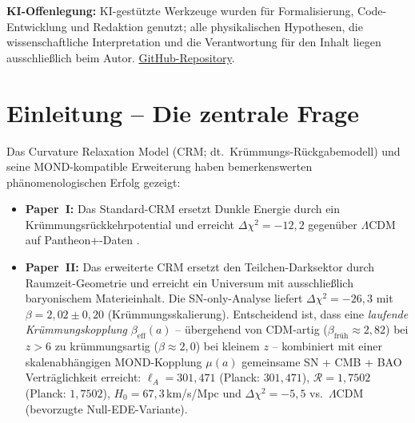 \documentclass[11pt,a4paper]{article}
\begin{document}
\clearpage
\begingroup
\footnotesize
{}
\setlength{\parskip}{0pt}
\tableofcontents

\vspace{0.35em}
{\scriptsize
\noindent\textbf{KI-Offenlegung:} KI-gest\"utzte Werkzeuge wurden f\"ur Formalisierung, Code-Entwicklung und Redaktion genutzt; alle physikalischen Hypothesen, die wissenschaftliche Interpretation und die Verantwortung f\"ur den Inhalt liegen ausschlie\ss{}lich beim Autor. \href{https://github.com/research-line/crm-cosmology}{GitHub-Repository}.}
\par
\endgroup
\clearpage

\section{Einleitung -- Die zentrale Frage}
\label{sec:intro}

Das Curvature Relaxation Model (CRM; dt.\ Kr\"ummungs-R\"uckgabemodell) \cite{Geiger2026} und seine MOND-kompatible Erweiterung \cite{Geiger2026b} haben bemerkenswerten ph\"anomenologischen Erfolg gezeigt:

\begin{itemize}
\item \textbf{Paper~I:} Das Standard-CRM ersetzt Dunkle Energie durch ein Kr\"ummungsr\"uckkehrpotential und erreicht $\Delta\chi^2 = -12{,}2$ gegen\"uber $\Lambda$CDM auf Pantheon+-Daten \cite{Scolnic2022}.
\item \textbf{Paper~II:} Das erweiterte CRM ersetzt den Teilchen-Darksektor durch Raumzeit-Geometrie und erreicht ein Universum mit ausschlie\ss lich baryonischem Materieinhalt. Die SN-only-Analyse liefert $\Delta\chi^2 = -26{,}3$ mit $\beta = 2{,}02 \pm 0{,}20$ (Kr\"ummungsskalierung). Entscheidend ist, dass eine \textit{laufende Kr\"ummungskopplung} $\beta_{\mathrm{eff}}(a)$ -- \"ubergehend von CDM-artig ($\beta_{\text{fr\"uh}} \approx 2{,}82$) bei $z > 6$ zu kr\"ummungsartig ($\beta \approx 2{,}0$) bei kleinem $z$ -- kombiniert mit einer skalenabh\"angigen MOND-Kopplung $\mu(a)$ gemeinsame SN + CMB + BAO Vertr\"aglichkeit erreicht: $\ell_A = 301{,}471$ (Planck: $301{,}471$), $\mathcal{R} = 1{,}7502$ (Planck: $1{,}7502$), $H_0 = 67{,}3$\,km/s/Mpc und $\Delta\chi^2 = -5{,}5$ vs.\ $\Lambda$CDM (bevorzugte Null-EDE-Variante).
\end{itemize}
\end{document}
